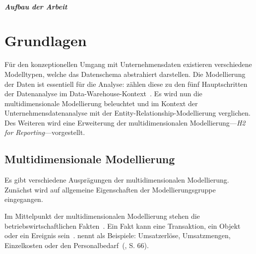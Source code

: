 \documentclass[
  language=german, %
  type=bachelor%
]{isthesis}
\begin{document}
\begin{content}
  \paragraph{Aufbau der Arbeit}




  \chapter{Grundlagen}
  


  Für den konzeptionellen Umgang mit Unternehmensdaten existieren verschiedene
  Modelltypen, welche das Datenschema abstrahiert darstellen.
  Die Modellierung der Daten ist essentiell für die Analyse:
  \textsc{\citeauthor{phipps2002automating}} zählen diese
  zu den fünf Hauptschritten der Datenanalyse im
  Data-Warehouse-Kontext~\cite[][S. 1]{phipps2002automating}. Es wird nun
  die multidimensionale Modellierung beleuchtet und im Kontext der Unternehmensdatenanalyse
  mit der Entity-Relationship-Modellierung verglichen. Des Weiteren wird
  eine Erweiterung der multidimensionalen Modellierung---\textit{H2 for
  Reporting}---vorgestellt.



  \section{Multidimensionale Modellierung}
  Es gibt verschiedene Ausprägungen der multidimensionalen Modellierung.
  Zunächst wird auf allgemeine Eigenschaften der Modellierungsgruppe eingegangen.

  Im Mittelpunkt der multidimensionalen Modellierung stehen die
  betriebswirtschaftlichen Fakten~\cite[][S.  2]{phipps2002automating}. Ein
  Fakt kann eine Transaktion, ein Objekt oder ein Ereignis sein~\cite[][S.
  42]{ballard1998data}. \textsc{\citeauthor{Kemper2010}} nennt als Beispiele:
  \glqq{}Umsatzerlöse, Umsatzmengen, Einzelkosten oder den
  Personalbedarf\grqq{}~(\citeyear{Kemper2010}, S. 66). 
  

\end{content}
\end{document}
